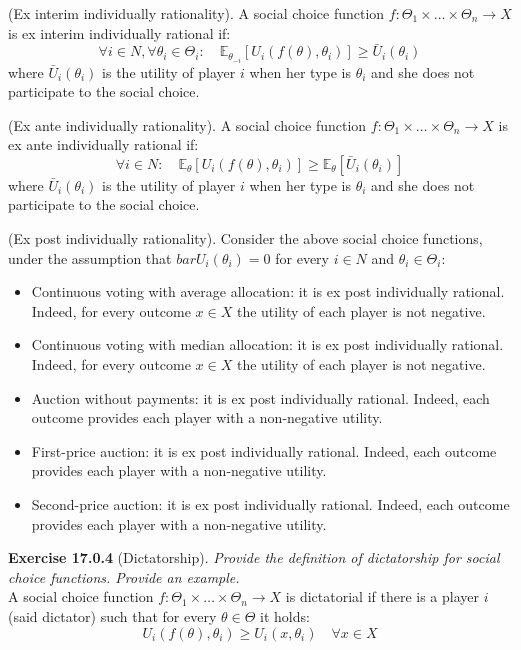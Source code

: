 (Ex interim individually rationality). A social choice function $f: \Theta_{1} \times \ldots \times \Theta_{n} \rightarrow X$ is ex interim individually rational if:
$$
\forall i \in N, \forall \theta_{i} \in \Theta_{i}: \quad \mathbb{E}_{\theta_{-i}}\left[U_{i}\left(f(\theta), \theta_{i}\right)\right] \geqslant \bar{U}_{i}\left(\theta_{i}\right)
$$
where $\bar{U}_{i}\left(\theta_{i}\right)$ is the utility of player $i$ when her type is $\theta_{i}$ and she does not participate to the social choice.

(Ex ante individually rationality). A social choice function $f: \Theta_{1} \times \ldots \times \Theta_{n} \rightarrow X$ is ex ante individually rational if:
$$
\forall i \in N: \quad \mathbb{E}_{\theta}\left[U_{i}\left(f(\theta), \theta_{i}\right)\right] \geqslant \mathbb{E}_{\theta}\left[\bar{U}_{i}\left(\theta_{i}\right)\right]
$$
where $\bar{U}_{i}\left(\theta_{i}\right)$ is the utility of player $i$ when her type is $\theta_{i}$ and she does not participate to the social choice.
 
(Ex post individually rationality). Consider the above social choice functions, under the assumption that $bar{U}_{i}\left(\theta_{i}\right)=0$ for every $i \in N$ and $\theta_i \in \Theta_i$:
\begin{itemize}
\item Continuous voting with average allocation: it is ex post individually rational. Indeed, for every outcome $x \in X$ the utility of each player is not negative.
\item Continuous voting with median allocation: it is ex post individually rational. Indeed, for every outcome $x \in X$ the utility of each player is not negative.
\item Auction without payments: it is ex post individually rational. Indeed, each outcome provides each player with a non-negative utility.
\item First-price auction: it is ex post individually rational. Indeed, each outcome provides each player with a non-negative utility.
\item Second-price auction: it is ex post individually rational. Indeed, each outcome provides each player with a non-negative utility.
\end{itemize}

\textbf{Exercise 17.0.4} (Dictatorship). \textit{Provide the definition of dictatorship for social choice functions. Provide an example.}\\

A social choice function $f: \Theta_{1} \times \ldots \times \Theta_{n} \rightarrow X$ is dictatorial if there is a player $i$ (said dictator) such that for every $\theta \in \Theta$ it holds:
$$
U_{i}\left(f(\theta), \theta_{i}\right) \geqslant U_{i}\left(x, \theta_{i}\right) \quad \forall x \in X
$$

